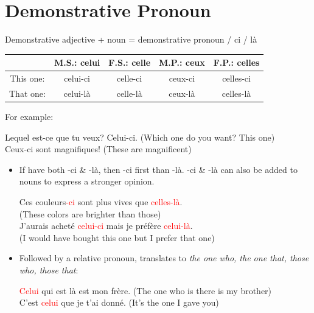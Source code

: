 \documentclass{book}
\begin{document}
    \section{Demonstrative Pronoun}
        Demonstrative adjective + noun = demonstrative pronoun / ci / là 
        \begin{center}
            \begin{tabular}{|c|c|c|c|c|}
                \hline
                & \textbf{M.S.}: celui & \textbf{F.S.}: celle & \textbf{M.P.}: ceux & \textbf{F.P.}: celles \\
                \hline
                This one: & celui-ci & celle-ci & ceux-ci & celles-ci \\
                \hline
                That one: & celui-là & celle-là & ceux-là & celles-là \\
                \hline
            \end{tabular}
        \end{center}
        For example:
        \begin{center}
            Lequel est-ce que tu veux? Celui-ci. \quad (Which one do you want? This one) \\
            Ceux-ci sont magnifiques! \quad (These are magnificent)
        \end{center}

        \begin{itemize}
            \item If have both -ci \& -là, then -ci first than -là. -ci \& -là can also be added to nouns to express a stronger opinion.
                \begin{center}
                    Ces couleurs\textcolor{red}{-ci} sont plus vives que \textcolor{red}{celles-là}. \\
                    (These colors are brighter than those) \\
                    J'aurais acheté \textcolor{red}{celui-ci} mais je préfère \textcolor{red}{celui-là}. \\
                    (I would have bought this one but I prefer that one)
                \end{center}

            \item Followed by a relative pronoun, translates to \textit{the one who, the one that, those who, those that}:
                \begin{center}
                    \textcolor{red}{Celui} qui est là est mon frère. \quad (The one who is there is my brother) \\
                    C'est \textcolor{red}{celui} que je t'ai donné. (It's the one I gave you)
                \end{center}
        \end{itemize}
\end{document}
